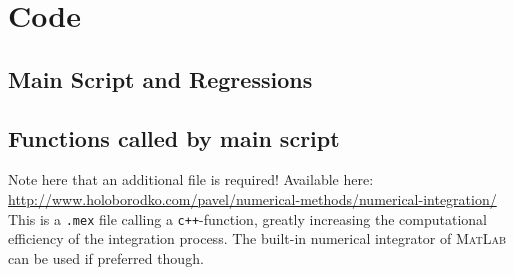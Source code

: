 \section{Code}
\subsection{Main Script and Regressions}
\label{sec:app1}




\subsection{Functions called by main script}
\label{sec:app2}


Note here that an additional file is required! Available here: \url{http://www.holoborodko.com/pavel/numerical-methods/numerical-integration/}\\
This is a \texttt{.mex} file calling a \texttt{c++}-function, greatly increasing the computational efficiency of the integration process. The built-in numerical integrator of \textsc{MatLab} can be used if preferred though.





















